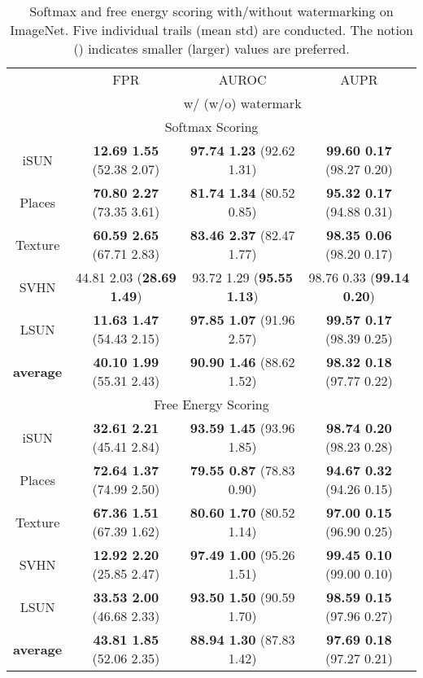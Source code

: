 \documentclass{article}
\begin{document}
\begin{table}[t]
\centering
\caption{Softmax and free energy scoring with/without watermarking on ImageNet. Five individual trails (mean  std) are conducted. The notion  () indicates smaller (larger) values are preferred.} \label{tab: imagenet}
\vspace{5pt}
\scriptsize{
\begin{tabular}{c|ccc}
\toprule[1.5pt]
                   & FPR      & AUROC        & AUPR       \\
                   \cline{2-4} 
\multirow{-2}{*}{} & \multicolumn{3}{c}{w/ (w/o) watermark} \\
\midrule[0.6pt]
\multicolumn{4}{c}{\cellcolor{greyL}Softmax Scoring} \\
\midrule[0.6pt]
iSUN               & \textbf{12.69  1.55} (52.38  2.07) & \textbf{97.74  1.23} (92.62  1.31) & \textbf{99.60  0.17} (98.27  0.20) \\
Places          & \textbf{70.80  2.27} (73.35  3.61) & \textbf{81.74  1.34} (80.52  0.85) & \textbf{95.32  0.17} (94.88  0.31) \\
Texture            & \textbf{60.59  2.65} ({67.71  2.83}) & \textbf{83.46  2.37} ({82.47  1.77}) & \textbf{98.35  0.06} ({98.20  0.17}) \\
SVHN               & {44.81  2.03} (\textbf{28.69  1.49}) & {93.72  1.29} (\textbf{95.55  1.13}) & {98.76  0.33} (\textbf{99.14  0.20}) \\
LSUN             & \textbf{11.63  1.47} (54.43  2.15) & \textbf{97.85  1.07} (91.96  2.57) & \textbf{99.57  0.17} (98.39  0.25) \\
\midrule
\textbf{average}   & \textbf{40.10  1.99} (55.31  2.43) & \textbf{90.90  1.46} (88.62  1.52) & \textbf{98.32  0.18} (97.77  0.22) \\ \midrule[1pt]
\multicolumn{4}{c}{\cellcolor{greyL}Free Energy Scoring} \\
\midrule[1pt]
iSUN               & \textbf{32.61  2.21} (45.41  2.84) & \textbf{93.59  1.45} (93.96  1.85) & \textbf{98.74  0.20} (98.23  0.28) \\ 
Places        & \textbf{72.64  1.37} (74.99  2.50) & \textbf{79.55  0.87} (78.83  0.90) & \textbf{94.67  0.32} (94.26  0.15) \\
Texture            & \textbf{67.36  1.51} (67.39  1.62) & \textbf{80.60  1.70} (80.52  1.14) & \textbf{97.00  0.15} (96.90  0.25) \\
SVHN               & \textbf{12.92  2.20} (25.85  2.47) & \textbf{97.49  1.00} (95.26  1.51) & \textbf{99.45  0.10} (99.00  0.10) \\
LSUN             & \textbf{33.53  2.00} (46.68  2.33) & \textbf{93.50  1.50} (90.59  1.70) & \textbf{98.59  0.15} (97.96  0.27) \\
\midrule
\textbf{average}   & \textbf{43.81  1.85} (52.06  2.35) & \textbf{88.94  1.30} (87.83  1.42) & \textbf{97.69  0.18} (97.27  0.21) \\ \bottomrule[1.5pt]      
\end{tabular}
}
\end{table}
\end{document}

